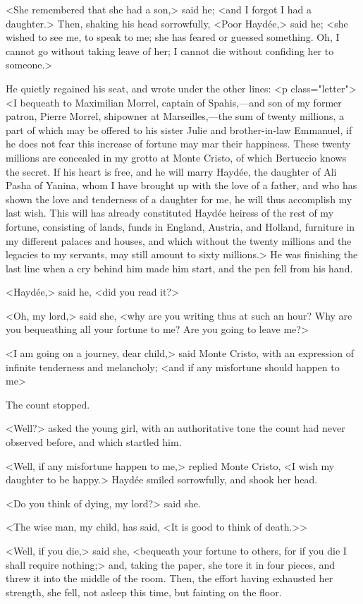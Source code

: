  <She remembered that she had a son,> said he; <and I forgot I had a daughter.> Then, shaking his head sorrowfully, <Poor Haydée,> said he; <she wished to see me, to speak to me; she has feared or guessed something. Oh, I cannot go without taking leave of her; I cannot die without confiding her to someone.> 

 He quietly regained his seat, and wrote under the other lines:  <p class="letter"> <I bequeath to Maximilian Morrel, captain of Spahis,—and son of my former patron, Pierre Morrel, shipowner at Marseilles,—the sum of twenty millions, a part of which may be offered to his sister Julie and brother-in-law Emmanuel, if he does not fear this increase of fortune may mar their happiness. These twenty millions are concealed in my grotto at Monte Cristo, of which Bertuccio knows the secret. If his heart is free, and he will marry Haydée, the daughter of Ali Pasha of Yanina, whom I have brought up with the love of a father, and who has shown the love and tenderness of a daughter for me, he will thus accomplish my last wish. This will has already constituted Haydée heiress of the rest of my fortune, consisting of lands, funds in England, Austria, and Holland, furniture in my different palaces and houses, and which without the twenty millions and the legacies to my servants, may still amount to sixty millions.>  He was finishing the last line when a cry behind him made him start, and the pen fell from his hand. 

 <Haydée,> said he, <did you read it?> 

 <Oh, my lord,> said she, <why are you writing thus at such an hour? Why are you bequeathing all your fortune to me? Are you going to leave me?> 

 <I am going on a journey, dear child,> said Monte Cristo, with an expression of infinite tenderness and melancholy; <and if any misfortune should happen to me\longdash> 

 The count stopped. 

 <Well?> asked the young girl, with an authoritative tone the count had never observed before, and which startled him. 

 <Well, if any misfortune happen to me,> replied Monte Cristo, <I wish my daughter to be happy.> Haydée smiled sorrowfully, and shook her head. 

 <Do you think of dying, my lord?> said she. 

 <The wise man, my child, has said, <It is good to think of death.>> 

 <Well, if you die,> said she, <bequeath your fortune to others, for if you die I shall require nothing;> and, taking the paper, she tore it in four pieces, and threw it into the middle of the room. Then, the effort having exhausted her strength, she fell, not asleep this time, but fainting on the floor. 

